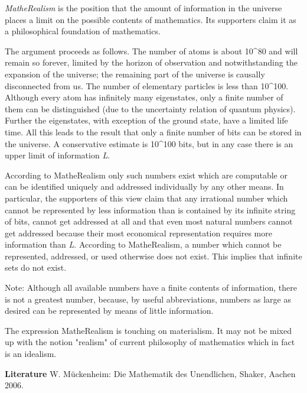 \documentclass[12pt]{article}
\begin{document}
\emph{MatheRealism} is the position that the amount of information in
the universe places a limit on the possible contents of mathematics.
Its supporters claim it as a philosophical foundation of mathematics.

The argument proceeds as follows.  The number of atoms is about
10^80 and will remain so forever, limited by the horizon of
observation and notwithstanding the expansion of the universe; the
remaining part of the universe is causally disconnected from us. The
number of elementary particles is less than 10^100. Although every
atom has infinitely many eigenstates, only a finite number of them can
be distinguished (due to the uncertainty relation of quantum
physics). Further the eigenstates, with exception of the ground state,
have a limited life time. All this leads to the result that only a finite number of bits
can be stored in the universe. A conservative estimate is 10^100
bits, but in any case there is an upper limit of information \emph{L}.

According to MatheRealism only such numbers exist which are computable or can be identified uniquely and addressed individually by any other means.  In particular, the supporters of
this view claim that any irrational number which cannot be
represented by less information than is contained by its infinite
string of bits, cannot get addressed at all and that even most natural
numbers cannot get addressed because their most economical
representation requires more information than \emph{L}.  According to
MatheRealism, a number which cannot be represented, addressed, or used
otherwise does not exist.  This implies that infinite sets do not exist.

Note: Although all available numbers have a finite contents of information, there is not a greatest number, because, by useful abbreviations, numbers as large as desired can be represented by means of little information.

The expression MatheRealism is touching on materialism. It may not be mixed up with the notion "realism" of current philosophy of mathematics which in fact is an idealism.


\textbf{Literature} W. M\"uckenheim: Die Mathematik des Unendlichen, Shaker, Aachen 2006.

\end{document}
